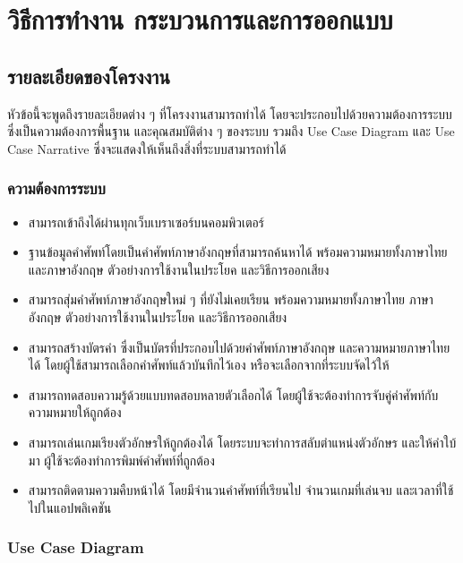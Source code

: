 \documentclass[12pt,oneside,openright,a4paper]{cpe-thai-project}
\begin{document}

\chapter{วิธีการทำงาน กระบวนการและการออกแบบ}

\section{รายละเอียดของโครงงาน}
\hspace{1cm}
หัวข้อนี้จะพูดถึงรายละเอียดต่าง ๆ ที่โครงงานสามารถทำได้ โดยจะประกอบไปด้วยความต้องการระบบ
ซึ่งเป็นความต้องการพื้นฐาน และคุณสมบัติต่าง ๆ ของระบบ รวมถึง Use Case Diagram
และ Use Case Narrative ซึ่งจะแสดงให้เห็นถึงสิ่งที่ระบบสามารถทำได้

\subsection{ความต้องการระบบ}
\begin{itemize}
	\item สามารถเข้าถึงได้ผ่านทุกเว็บเบราเซอร์บนคอมพิวเตอร์
	\item ฐานข้อมูลคำศัพท์โดยเป็นคำศัพท์ภาษาอังกฤษที่สามารถค้นหาได้ พร้อมความหมายทั้งภาษาไทยและภาษาอังกฤษ ตัวอย่างการใช้งานในประโยค และวิธีการออกเสียง
	\item สามารถสุ่มคำศัพท์ภาษาอังกฤษใหม่ ๆ ที่ยังไม่เคยเรียน พร้อมความหมายทั้งภาษาไทย ภาษาอังกฤษ ตัวอย่างการใช้งานในประโยค และวิธีการออกเสียง
	\item สามารถสร้างบัตรคำ ซึ่งเป็นบัตรที่ประกอบไปด้วยคำศัพท์ภาษาอังกฤษ และความหมายภาษาไทยได้ โดยผู้ใช้สามารถเลือกคำศัพท์แล้วบันทึกไว้เอง หรือจะเลือกจากที่ระบบจัดไว้ให้
	\item สามารถทดสอบความรู้ด้วยแบบทดสอบหลายตัวเลือกได้ โดยผู้ใช้จะต้องทำการจับคู่คำศัพท์กับความหมายให้ถูกต้อง
	\item สามารถเล่นเกมเรียงตัวอักษรให้ถูกต้องได้ โดยระบบจะทำการสลับตำแหน่งตัวอักษร และให้คำใบ้มา ผู้ใช้จะต้องทำการพิมพ์คำศัพท์ที่ถูกต้อง
	\item สามารถติดตามความคืบหน้าได้ โดยมีจำนวนคำศัพท์ที่เรียนไป จำนวนเกมที่เล่นจบ และเวลาที่ใช้ไปในแอปพลิเคชัน
\end{itemize}

\pagebreak
\subsection{Use Case Diagram}
\end{document}
